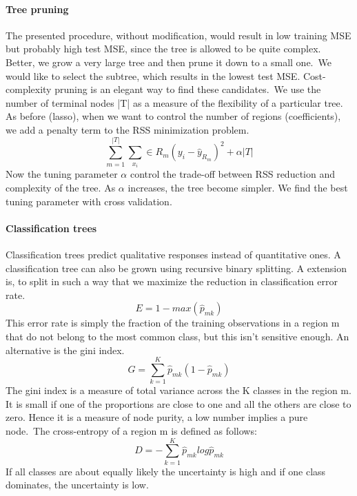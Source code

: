 \documentclass[../document.tex]{subfiles}
\begin{document}
	\paragraph{Tree pruning}
	The presented procedure, without modification, would result in low training MSE but probably high test MSE, since the tree is allowed to be quite complex. Better, we grow a very large tree and then prune it down to a small one.\
	We would like to select the subtree, which results in the lowest test MSE. Cost-complexity pruning is an elegant way to find these candidates.\
	We use the number of terminal nodes |T| as a measure of the flexibility of a particular tree. As before (lasso), when we want to control the number of regions (coefficients), we add a penalty term to the RSS minimization problem.
	\begin{equation}
		\sum_{m=1}^{|T|}\sum_{x_{i}} \in R_{m}(y_{i}-\hat{y}_{R_{m}})^2 + \alpha|T|
	\end{equation}
	Now the tuning parameter \(\alpha\) control the trade-off between RSS reduction and complexity of the tree. As \(\alpha\) increases, the tree become simpler. We find the best tuning parameter with cross validation.
	\paragraph{Classification trees}
	Classification trees predict qualitative responses instead of quantitative ones. A classification tree can also be grown using recursive binary splitting. A extension is, to split in such a way that we maximize the reduction in classification error rate.
	\begin{equation}
		E = 1-max(\hat{p}_{mk})
	\end{equation}
	This error rate is simply the fraction of the training observations in a region m that do not belong to the most common class, but this isn't sensitive enough. An alternative is the gini index.
	\begin{equation}
		G = \sum_{k=1}^{K}\hat{p}_{mk}(1-\hat{p}_{mk})
	\end{equation}
	The gini index is a measure of total variance across the K classes in the region m. It is small if one of the proportions are close to one and all the others are close to zero. Hence it is a measure of node purity, a low number implies a pure node.\
	The cross-entropy of a region m is defined as follows:
	\begin{equation}
		D = -\sum_{k=1}^{K}\hat{p}_{mk}log\hat{p}_{mk}
	\end{equation}
	If all classes are about equally likely the uncertainty is high and if one class dominates, the uncertainty is low.
\end{document}
